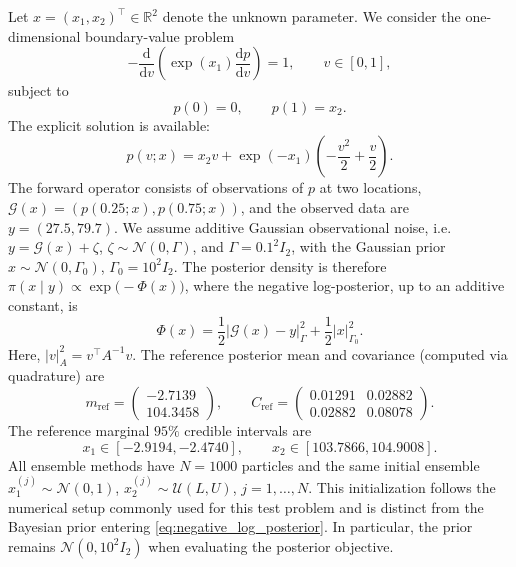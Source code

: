 \documentclass{article}
\numberwithin{equation}{section}
\begin{document}
Let $x=(x_1,x_2)^\top\in\mathbb{R}^2$ denote the unknown parameter. We consider the one-dimensional boundary-value problem
\begin{equation*}
    -\frac{\mathrm{d}}{\mathrm{d}v}
    \left(\exp(x_1)\frac{\mathrm{d}p}{\mathrm{d}v}
    \right) =1, \qquad v\in[0,1],
    \label{tsoeqn:low_dim_pde}
\end{equation*}
subject to
\begin{equation*}
    p(0)=0,  \qquad
    p(1)=x_2.
\end{equation*}
The explicit solution is available:
\begin{equation*}
    p(v;x) =x_2v
    +  \exp(-x_1)\left(-\frac{v^2}{2}+\frac{v}{2}\right).\label{tso_eqn_low_dim_explicit_solution}
\end{equation*}
The forward operator consists of observations of $p$ at two locations, $\mathcal{G}(x)
    =  (p(0.25;x), p(0.75;x))$,
and the observed data are $y= (27.5,    79.7)$. We assume additive Gaussian observational noise, i.e. $y=\mathcal{G}(x)+\zeta$, $\zeta\sim\mathcal{N}(0,\Gamma)$, and $\Gamma=0.1^2 I_2$,
with the Gaussian prior $ x\sim\mathcal{N}(0,\Gamma_0)$, $\Gamma_0=10^2 I_2$. 
The posterior density is therefore  $   \pi(x\mid y)
    \propto
    \exp\big(-\Phi(x)\big)$,
where the negative log-posterior, up to an additive constant, is
\begin{equation}
    \Phi(x) =
    \frac{1}{2}
    \left| \mathcal{G}(x)-y
    \right|_{\Gamma}^{2}
    +
    \frac{1}{2}
    \left|x\right|_{\Gamma_0}^{2}.
    \label{eq:negative_log_posterior}
\end{equation}
Here, $|v|_A^2=v^\top A^{-1}v$. 
The reference posterior mean and covariance (computed via quadrature) are
\begin{equation*}
    m_{\mathrm{ref}}=
    \begin{pmatrix}-2.7139\\
        104.3458
    \end{pmatrix},
    \qquad
    C_{\mathrm{ref}}
    =
    \begin{pmatrix}  0.01291 & 0.02882\\
        0.02882 & 0.08078
    \end{pmatrix}.
    \label{tso_eqn:reference_moments}
\end{equation*}
The reference marginal $95\%$ credible intervals are
\begin{equation}
    x_1\in[-2.9194,-2.4740],
    \qquad
    x_2\in[103.7866,104.9008].
    \label{tso_eqn_refere_intervals}
\end{equation}
All ensemble methods have $N = 1000$ particles and the same initial ensemble $x_1^{(j)}\sim\mathcal{N}(0,1)$, $    x_2^{(j)}\sim\mathcal{U}(L,U)$, $  j=1,\ldots,N$.
This initialization follows the numerical setup commonly used for this test problem and is distinct from the Bayesian prior entering \eqref{eq:negative_log_posterior}. In particular, the prior remains $\mathcal{N}(0,10^2I_2)$ when evaluating the posterior objective. 
\end{document}
